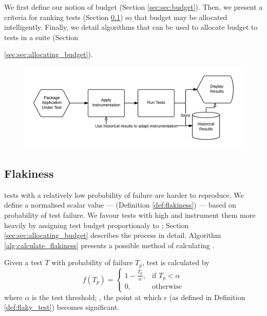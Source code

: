 We first define our notion of budget (Section \ref{sec:sec:budget}). Then, we present a criteria for ranking \flaky{} tests (Section \ref{sec:sec:flakiness}) so that budget may be allocated intelligently. Finally, we detail algorithms that can be used to allocate budget to tests in a suite (Section {\ref{sec:sec:allocating_budget}).

\begin{figure}[h]
\includegraphics[width=\linewidth]{images/architecture_overview}
\caption{}
\label{fig:architecture_overview}
\end{figure}

\subsection{Flakiness}
\label{sec:sec:flakiness}

\Flaky{} tests with a relatively low probability of failure are harder to reproduce. We define a normalised scalar value --- \emph{\flakiness} (Definition \ref{def:flakiness}) --- based on probability of test failure. We favour tests with high \flakiness{} and instrument them more heavily by assigning \flaky{} test budget proportionaly to \flakiness{}; Section \ref{sec:sec:allocating_budget} describes the process in detail. Algorithm \ref{alg:calculate_flakiness} presents a possible method of calculating \flakiness{}.

\begin{defn}[\Flakiness{}]\label{def:flakiness}

Given a test $T$ with probability of failure $T_{p}$, test \flakiness{} is calculated by
\[
    f(T_{p})=
	\begin{cases}
	    1 - \frac{T_{p}}{\alpha},& \text{if } T_{p}< \alpha\\
	    0,              & \text{otherwise}
	\end{cases}
\]
where $\alpha$ is the \flaky{} test threshold; \ie, the point at which $\epsilon$ (as defined in Definition \ref{def:flaky_test}) becomes significant.


\end{defn}}
